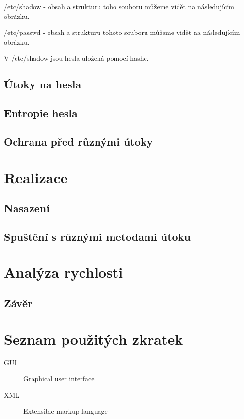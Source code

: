 \documentclass[thesis=B,czech]{FITthesis}[2019/12/23]
\begin{document}
/etc/shadow - obsah a strukturu toho souboru můžeme vidět na následujícím obrázku. 


/etc/passwd - obsah a strukturu tohoto souboru můžeme vidět na následujícím obrázku.


V /etc/shadow jsou hesla uložená pomocí hashe. 

\section{Útoky na hesla}

\section{Entropie hesla}

\section{Ochrana před různými útoky}

\chapter{Realizace}

\section{Nasazení}

\section{Spuštění s různými metodami útoku}

\chapter{Analýza rychlosti}


\section{Závěr}





\appendix

\chapter{Seznam použitých zkratek}
\begin{description}
	\item[GUI] Graphical user interface
	\item[XML] Extensible markup language
\end{description}
\end{document}
